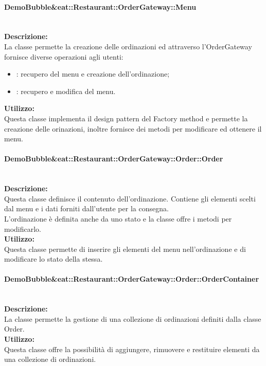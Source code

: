 \paragraph{Demo\-Bubble\&eat\-::Restaurant\-::Order\-Gateway\-::Menu}\label{eat-menu}\mbox{}\\
\textbf{Descrizione:}\\
La classe permette la creazione delle ordinazioni ed attraverso l'Order\-Gateway fornisce diverse operazioni agli utenti:
\begin{itemize}
	\item \Customer{}: recupero del menu e creazione dell'ordinazione;
	\item \Manager{}: recupero e modifica del menu.
\end{itemize}
\textbf{Utilizzo:}\\
Questa classe implementa il design pattern del Factory method e permette la creazione delle orinazioni, inoltre fornisce dei metodi per modificare ed ottenere il menu.

\paragraph{Demo\-Bubble\&eat\-::Restaurant\-::Order\-Gateway\-::Order\-::Order}\label{eat-order}\mbox{}\\ 
\textbf{Descrizione:}\\
Questa classe definisce il contenuto dell'ordinazione. Contiene gli elementi scelti dal menu e i dati forniti dall'utente per la consegna.\\
L'ordinazione è definita anche da uno stato e la classe offre i metodi per modificarlo. \\
\textbf{Utilizzo:}\\
Questa classe permette di inserire gli elementi del menu nell'ordinazione e di modificare lo stato della stessa. 

\paragraph{Demo\-Bubble\&eat\-::Restaurant\-::Order\-Gateway\-::Order\-::Order\-Contai\-ner}\label{eat-container}\mbox{}\\
\textbf{Descrizione:}\\
La classe permette la gestione di una collezione di ordinazioni definiti dalla classe Order.\\
\textbf{Utilizzo:}\\
Questa classe offre la possibilità di aggiungere, rimuovere e restituire elementi da una collezione di ordinazioni.